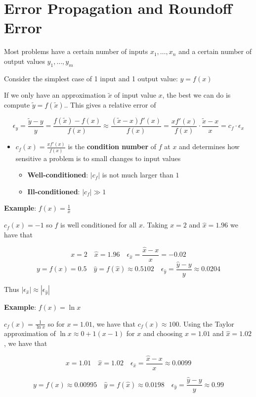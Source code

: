 \documentclass{article}
\begin{document}
  \section{Error Propagation and Roundoff Error}
  Most problems have a certain number of inputs $x_1, \ldots, x_n$ and a certain number of output values $y_1, \ldots, y_m$

  Consider the simplest case of 1 input and 1 output value: $y = f(x)$

  If we only have an approximation $\tilde{x}$ of input value $x$, the best we can do is compute $\tilde{y} = f(\tilde{x})$.. This gives a relative error of

  \[\epsilon_y = \frac{\tilde{y} - y}{y} = \frac{f(\tilde{x}) - f(x)}{f(x)} \approx \frac{(\tilde{x} - x)f'(x)}{f(x)} = \frac{xf'(x)}{f(x)} \cdot \frac{\tilde{x} - x}{x} = c_f \cdot \epsilon_x\]
  \begin{itemize}
    \item $c_f(x) = \frac{x f'(x)}{f(x)}$ is the \textbf{condition number} of $f$ at $x$ and determines how sensitive a problem is to small changes to input values
      \begin{itemize}
        \item \textbf{Well-conditioned}: $|c_f|$ is not much larger than $1$
        \item \textbf{Ill-conditioned}: $|c_f| \gg 1$
      \end{itemize}
  \end{itemize}
  \textbf{Example}: $f(x) = \frac{1}{x}$

  $c_f(x) = -1$ so $f$ is well conditioned for all $x$. Taking $x = 2$ and $\hat{x} = 1.96$ we have that

  \[x = 2 \quad \hat{x} = 1.96 \quad \epsilon_{\hat{x}} = \frac{\hat{x} - x}{x} = -0.02\]
  \[y = f(x) = 0.5 \quad \hat{y} = f(\hat{x}) \approx 0.5102 \quad \epsilon_{\hat{y}} = \frac{\hat{y} - y}{y} \approx 0.0204\]

  Thus $|\epsilon_{\hat{x}}| \approx |\epsilon_{\hat{y}}|$

  \textbf{Example}: $f(x) = \ln{x}$

  $c_f(x) = \frac{1}{\ln{x}}$ so for $x = 1.01$, we have that $c_f(x) \approx 100$. Using the Taylor approximation of $\ln{x} \approx 0 + 1 (x - 1)$ for $x$ and choosing $x = 1.01$ and $\hat{x} = 1.02$, we have that

  \[x = 1.01 \quad \hat{x} = 1.02 \quad \epsilon_{\hat{x}} = \frac{\hat{x} - x}{x} \approx 0.0099\]

  \[y = f(x) \approx 0.00995 \quad \hat{y} = f(\hat{x}) \approx 0.0198 \quad \epsilon_{\hat{y}} = \frac{\hat{y} - y}{y} \approx 0.99\]
\end{document}
